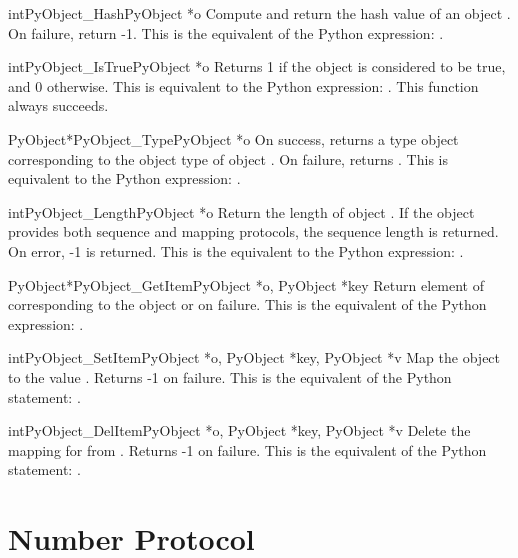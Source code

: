 \documentclass[twoside,openright]{report}
\begin{document}
\begin{cfuncdesc}{int}{PyObject_Hash}{PyObject *o}
Compute and return the hash value of an object .  On
failure, return -1.  This is the equivalent of the Python
expression: .
\end{cfuncdesc}


\begin{cfuncdesc}{int}{PyObject_IsTrue}{PyObject *o}
Returns 1 if the object  is considered to be true, and
0 otherwise. This is equivalent to the Python expression:
.
This function always succeeds.
\end{cfuncdesc}


\begin{cfuncdesc}{PyObject*}{PyObject_Type}{PyObject *o}
On success, returns a type object corresponding to the object
type of object . On failure, returns \NULL{}.  This is
equivalent to the Python expression: .
\end{cfuncdesc}

\begin{cfuncdesc}{int}{PyObject_Length}{PyObject *o}
Return the length of object .  If the object  provides
both sequence and mapping protocols, the sequence length is
returned. On error, -1 is returned.  This is the equivalent
to the Python expression: .
\end{cfuncdesc}


\begin{cfuncdesc}{PyObject*}{PyObject_GetItem}{PyObject *o, PyObject *key}
Return element of  corresponding to the object  or \NULL{}
on failure. This is the equivalent of the Python expression:
.
\end{cfuncdesc}


\begin{cfuncdesc}{int}{PyObject_SetItem}{PyObject *o, PyObject *key, PyObject *v}
Map the object  to the value .
Returns -1 on failure.  This is the equivalent
of the Python statement: .
\end{cfuncdesc}


\begin{cfuncdesc}{int}{PyObject_DelItem}{PyObject *o, PyObject *key, PyObject *v}
Delete the mapping for  from .  Returns -1
on failure.
This is the equivalent of the Python statement: .
\end{cfuncdesc}


\section{Number Protocol}
\end{document}
